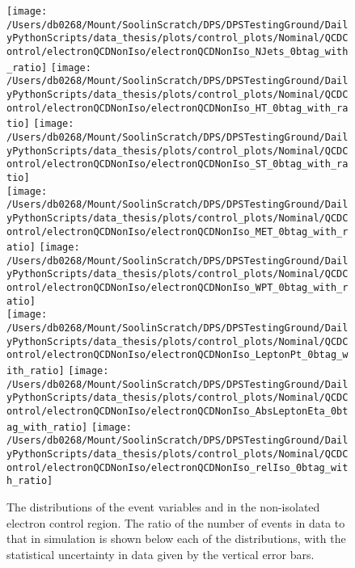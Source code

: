 \begin{figure}[hp]
	\centering
	\texttt{[image: /Users/db0268/Mount/SoolinScratch/DPS/DPSTestingGround/DailyPythonScripts/data\_thesis/plots/control\_plots/Nominal/QCDControl/electronQCDNonIso/electronQCDNonIso\_NJets\_0btag\_with\_ratio]}
	\texttt{[image: /Users/db0268/Mount/SoolinScratch/DPS/DPSTestingGround/DailyPythonScripts/data\_thesis/plots/control\_plots/Nominal/QCDControl/electronQCDNonIso/electronQCDNonIso\_HT\_0btag\_with\_ratio]}
	\texttt{[image: /Users/db0268/Mount/SoolinScratch/DPS/DPSTestingGround/DailyPythonScripts/data\_thesis/plots/control\_plots/Nominal/QCDControl/electronQCDNonIso/electronQCDNonIso\_ST\_0btag\_with\_ratio]} \\
	\texttt{[image: /Users/db0268/Mount/SoolinScratch/DPS/DPSTestingGround/DailyPythonScripts/data\_thesis/plots/control\_plots/Nominal/QCDControl/electronQCDNonIso/electronQCDNonIso\_MET\_0btag\_with\_ratio]}
	\texttt{[image: /Users/db0268/Mount/SoolinScratch/DPS/DPSTestingGround/DailyPythonScripts/data\_thesis/plots/control\_plots/Nominal/QCDControl/electronQCDNonIso/electronQCDNonIso\_WPT\_0btag\_with\_ratio]} \\
	\texttt{[image: /Users/db0268/Mount/SoolinScratch/DPS/DPSTestingGround/DailyPythonScripts/data\_thesis/plots/control\_plots/Nominal/QCDControl/electronQCDNonIso/electronQCDNonIso\_LeptonPt\_0btag\_with\_ratio]} 
	\texttt{[image: /Users/db0268/Mount/SoolinScratch/DPS/DPSTestingGround/DailyPythonScripts/data\_thesis/plots/control\_plots/Nominal/QCDControl/electronQCDNonIso/electronQCDNonIso\_AbsLeptonEta\_0btag\_with\_ratio]}
	\texttt{[image: /Users/db0268/Mount/SoolinScratch/DPS/DPSTestingGround/DailyPythonScripts/data\_thesis/plots/control\_plots/Nominal/QCDControl/electronQCDNonIso/electronQCDNonIso\_relIso\_0btag\_with\_ratio]}
	\caption[The distributions of the event variables and \Irel{} in the non-isolated electron control region. The ratio of the number of events in data to that in simulation is shown below each of the distributions, with the statistical uncertainty in data given by the vertical error bars.]{The distributions of the event variables and \Irel{} in the non-isolated electron control region. The ratio of the number of events in data to that in simulation is shown below each of the distributions, with the statistical uncertainty in data given by the vertical error bars.}
	\label{fig:QCDeNonIso}
\end{figure}
